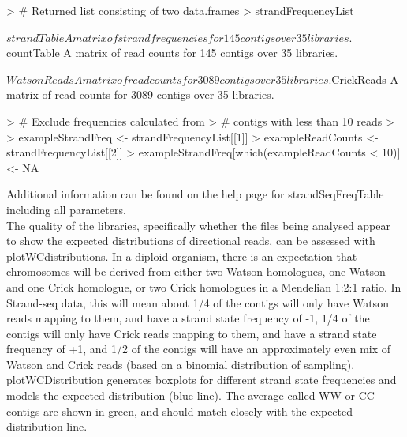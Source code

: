 \documentclass{article}
\begin{document}
\begin{Schunk}
\begin{Sinput}
> # Returned list consisting of two data.frames
> strandFrequencyList
\end{Sinput}
\begin{Soutput}
$strandTable
A matrix of strand frequencies for 145 contigs over 35 libraries.

$countTable
A matrix of read counts for 145 contigs over 35 libraries.

$WatsonReads
A matrix of read counts for 3089 contigs over 35 libraries.

$CrickReads
A matrix of read counts for 3089 contigs over 35 libraries.
\end{Soutput}
\begin{Sinput}
> # Exclude frequencies calculated from
> # contigs with less than 10 reads
> 
> exampleStrandFreq <- strandFrequencyList[[1]]
> exampleReadCounts <- strandFrequencyList[[2]]
> exampleStrandFreq[which(exampleReadCounts < 10)] <- NA 
\end{Sinput}
\end{Schunk}

Additional information can be found on the help page for strandSeqFreqTable including all parameters.\\

The quality of the libraries, specifically whether the files being analysed appear to show the expected distributions of directional reads, can be assessed with plotWCdistributions.  In a diploid organism, there is an expectation that chromosomes will be derived from either two Watson homologues, one Watson and one Crick homologue, or two Crick homologues in a Mendelian 1:2:1 ratio.  In Strand-seq data, this will mean about 1/4 of the contigs will only have Watson reads mapping to them, and have a strand state frequency of -1, 1/4 of the contigs will only have Crick reads mapping to them, and have a strand state frequency of +1, and 1/2 of the contigs will have an approximately even mix of Watson and Crick reads (based on a binomial distribution of sampling).  plotWCDistribution generates boxplots for different strand state frequencies and models the expected distribution (blue line). The average called WW or CC contigs are shown in green, and should match closely with the expected distribution line.
\end{document}
